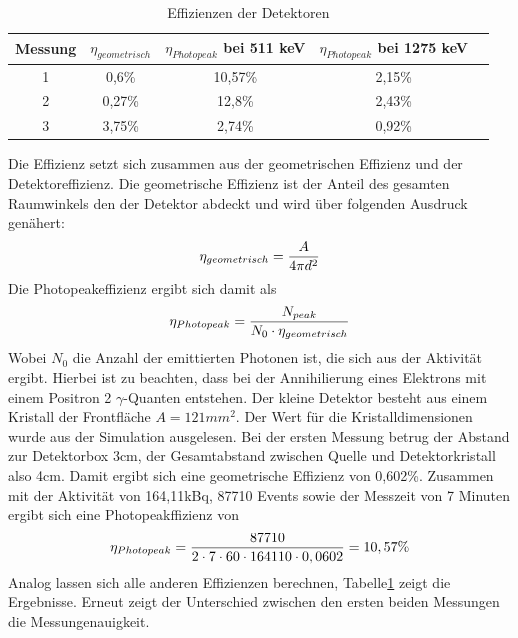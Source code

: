 \documentclass[a4paper,14pt,twoside]{article}
\begin{document}
\begin{table}
\begin{center}
    \caption{Effizienzen der Detektoren}
    \label{l4}
    \begin{tabular}[c]{|c|c|c|c|c|}
    \hline
    Messung & $\eta_{geometrisch}$&$\eta_{Photopeak}$ bei 511 keV &$\eta_{Photopeak}$ bei 1275 keV \\\hline 
     1 & 0,6\% & 10,57\%&2,15\%\\\hline
     2 & 0,27\% & 12,8\%&2,43\%\\\hline
     3 &3,75\% & 2,74\%&0,92\%\\\hline
     
    
    \hline
    \end{tabular}
\end{center}
\end{table}
Die Effizienz setzt sich zusammen aus der geometrischen Effizienz und der Detektoreffizienz. Die geometrische Effizienz ist der Anteil des gesamten Raumwinkels den der Detektor abdeckt und wird über folgenden Ausdruck genähert:
\begin{equation}
\eta_{geometrisch}={A\over 4 \pi d^2}
\end{equation}
Die Photopeakeffizienz ergibt sich damit als
\begin{equation}
\eta_{Photopeak}={N_{peak}\over N_0\cdot\eta_{geometrisch}}
\end{equation}
Wobei $N_0$ die Anzahl der emittierten Photonen ist, die sich aus der Aktivität ergibt. Hierbei ist zu beachten, dass bei der Annihilierung eines Elektrons mit einem Positron 2 $\gamma$-Quanten entstehen. Der kleine Detektor besteht aus einem Kristall der Frontfläche $A=121mm^2$. Der Wert für die Kristalldimensionen wurde aus der Simulation ausgelesen. Bei der ersten Messung betrug der Abstand zur Detektorbox 3cm, der Gesamtabstand zwischen Quelle und Detektorkristall also 4cm. Damit ergibt sich eine geometrische Effizienz von 0,602\%. Zusammen mit der Aktivität von 164,11kBq, 87710 Events sowie der Messzeit von 7 Minuten ergibt sich eine Photopeakffizienz von
\begin{equation}
\eta_{Photopeak}={87710\over 2\cdot7\cdot60\cdot164110\cdot0,0602}=10,57\%
\end{equation}
Analog lassen sich alle anderen Effizienzen berechnen, Tabelle\ref{l4} zeigt die Ergebnisse. Erneut zeigt der Unterschied zwischen den ersten beiden Messungen die Messungenauigkeit.
\end{document}
